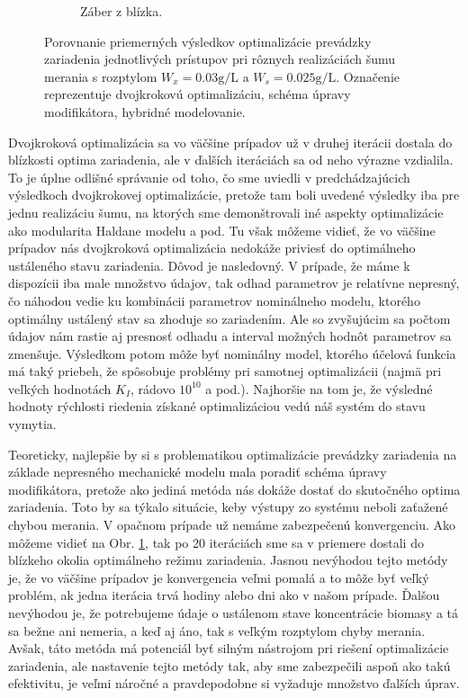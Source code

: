 \begin{figure}
\begin{subfigure}[b]{0.49\textwidth}
		\caption{Záber z blízka. \newline \newline}
		\label{fig:opt_approaches_comparison_zoomed}
	\end{subfigure}
	\caption{Porovnanie priemerných výsledkov optimalizácie prevádzky zariadenia jednotlivých prístupov pri rôznych realizáciách šumu merania s rozptylom $ W_{x} = 0.03\si{\gram\per\liter} $ a $ W_{s} = 0.025\si{\gram\per\liter} $. Označenie  reprezentuje dvojkrokovú optimalizáciu,  schéma úpravy modifikátora,  hybridné modelovanie.}
	\label{fig:method_comparison_bigNoise}
\end{figure}

Dvojkroková optimalizácia sa vo väčšine prípadov už v druhej iterácii dostala do blízkosti optima zariadenia, ale v ďalších iteráciách sa od neho výrazne vzdialila.
To je úplne odlišné správanie od toho, čo sme uviedli v predchádzajúcich výsledkoch dvojkrokovej optimalizácie, pretože tam boli uvedené výsledky iba pre jednu realizáciu šumu, na ktorých sme demonštrovali iné aspekty optimalizácie ako modularita Haldane modelu a pod. Tu však môžeme vidieť, že vo väčšine prípadov nás dvojkroková optimalizácia nedokáže priviesť do optimálneho ustáleného stavu zariadenia. Dôvod je nasledovný. V prípade, že máme k dispozícii iba male množstvo údajov, tak odhad parametrov je relatívne nepresný,
čo náhodou vedie ku kombinácii parametrov nominálneho modelu, ktorého optimálny ustálený stav sa zhoduje so zariadením. Ale so zvyšujúcim sa počtom údajov nám rastie aj presnosť odhadu a interval možných hodnôt parametrov sa zmenšuje. Výsledkom potom môže byť nominálny model, ktorého účelová funkcia má taký priebeh, že spôsobuje problémy pri samotnej optimalizácii (najmä pri veľkých hodnotách $ K_I $, rádovo $ 10^{10} $ a pod.). Najhoršie na tom je, že výsledné hodnoty rýchlosti riedenia získané optimalizáciou vedú náš systém do stavu vymytia.

Teoreticky, najlepšie by si s problematikou optimalizácie prevádzky zariadenia na základe nepresného mechanické modelu mala poradiť schéma úpravy modifikátora, pretože ako jediná metóda nás dokáže dostať do skutočného optima zariadenia. Toto by sa týkalo situácie, keby výstupy zo systému neboli zaťažené chybou merania. V opačnom prípade už nemáme zabezpečenú konvergenciu. Ako môžeme vidieť na Obr. \ref{fig:opt_approaches_comparison_zoomed}, tak po 20 iteráciách sme sa v priemere dostali do blízkeho okolia optimálneho režimu zariadenia. Jasnou nevýhodou tejto metódy je, že vo väčšine prípadov je konvergencia veľmi pomalá a to môže byť veľký problém, ak jedna iterácia trvá hodiny alebo dni ako v našom prípade. Ďalšou nevýhodou je, že potrebujeme údaje o ustálenom stave koncentrácie biomasy a tá sa bežne ani nemeria, a keď aj áno, tak s veľkým rozptylom chyby merania. Avšak, táto metóda má potenciál byť silným nástrojom pri riešení optimalizácie zariadenia, ale nastavenie tejto metódy tak, aby sme zabezpečili aspoň ako takú efektivitu, je veľmi náročné a pravdepodobne si vyžaduje množstvo ďalších úprav.

